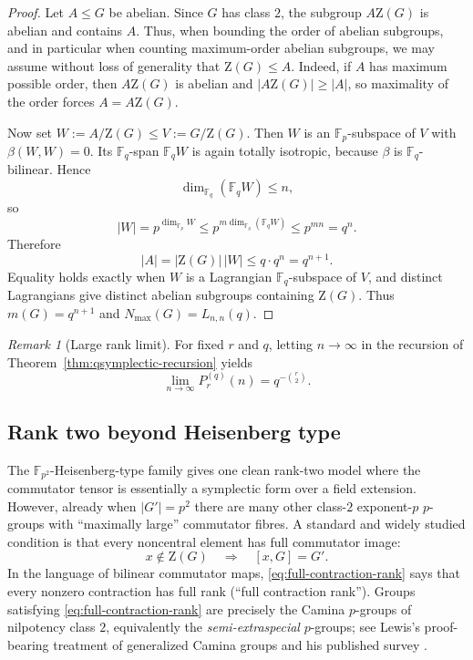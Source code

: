 \documentclass[11pt]{article}
\theoremstyle{definition}
\theoremstyle{remark}
\newtheorem{remark}[theorem]{Remark}
\theoremstyle{definition}
\theoremstyle{plain}
\newcommand{\Z}{\mathrm{Z}}
\begin{document}
\begin{proof}
Let $A\le G$ be abelian. Since $G$ has class $2$, the subgroup $A\Z(G)$ is abelian and contains $A$.
Thus, when bounding the order of abelian subgroups, and in particular when counting maximum-order abelian subgroups, we may assume without loss of generality that $\Z(G)\le A$. Indeed, if $A$ has maximum possible order, then $A\Z(G)$ is abelian and $|A\Z(G)|\ge |A|$, so maximality of the order forces $A=A\Z(G)$.

Now set $W:=A/\Z(G)\le V:=G/\Z(G)$. Then $W$ is an $\mathbb F_p$-subspace of $V$ with $\beta(W,W)=0$.
Its $\mathbb F_q$-span $\mathbb F_qW$ is again totally isotropic, because $\beta$ is $\mathbb F_q$-bilinear.
Hence
\[
\dim_{\mathbb F_q}(\mathbb F_qW)\le n,
\]
so
\[
|W|=p^{\dim_{\mathbb F_p}W}\le p^{m\dim_{\mathbb F_q}(\mathbb F_qW)}\le p^{mn}=q^n.
\]
Therefore
\[
|A|=|\Z(G)|\,|W|\le q\cdot q^n=q^{n+1}.
\]
Equality holds exactly when $W$ is a Lagrangian $\mathbb F_q$-subspace of $V$, and distinct Lagrangians give distinct
abelian subgroups containing $\Z(G)$. Thus $m(G)=q^{n+1}$ and $N_{\max}(G)=L_{n,n}(q)$.
\end{proof}

\begin{remark}[Large rank limit]\label{rem:qsymplectic-limit}
For fixed $r$ and $q$, letting $n\to\infty$ in the recursion of Theorem~\ref{thm:qsymplectic-recursion} yields
\[
\lim_{n\to\infty} P_r^{(q)}(n)=q^{-\binom{r}{2}}.
\]
\end{remark}

\subsection{Rank two beyond Heisenberg type}\label{subsec:rank2-ses}

The $\mathbb F_{p^2}$-Heisenberg-type family gives one clean rank-two model where the commutator tensor is essentially
a symplectic form over a field extension.  However, already when $|G'|=p^2$ there are many other class-$2$ exponent-$p$
$p$-groups with ``maximally large'' commutator fibres.  A standard and widely studied condition is that every noncentral
element has full commutator image:
\begin{equation}\label{eq:full-contraction-rank}
x\notin \Z(G)\quad\Longrightarrow\quad [x,G]=G'.
\end{equation}
In the language of bilinear commutator maps, \eqref{eq:full-contraction-rank} says that every nonzero contraction has full
rank (``full contraction rank'').  Groups satisfying \eqref{eq:full-contraction-rank} are precisely the Camina $p$-groups of
nilpotency class $2$, equivalently the \emph{semi-extraspecial} $p$-groups; see Lewis's proof-bearing treatment of generalized Camina groups \cite{Lewis2009Camina} and his published survey \cite[Theorems~5.1--5.2]{Lewis2019Survey}.
\end{document}
